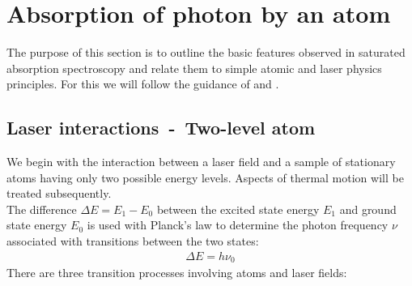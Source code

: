 
\chapter{Absorption of photon by an atom}  %
The purpose of this section is to outline the basic features observed in saturated absorption
spectroscopy and relate them to simple atomic and laser physics principles.
For this we will follow the guidance of \citep{SAS} and \citep{SAS_appendix}.

\ifpdf{}
    \graphicspath{{Chapter2/Figs/Raster/}{Chapter2/Figs/PDF/}{Chapter2/Figs/}}
\else
    \graphicspath{{Chapter2/Figs/Vector/}{Chapter2/Figs/}}
\fi



\section{Laser interactions~-~Two-level atom} %

We begin with the interaction between a laser field and a sample of stationary atoms having
only two possible energy levels. Aspects of thermal motion will be treated subsequently.\\
The difference \(\Delta E = E_1 - E_0\) between the excited state  energy \(E_1\) and
ground state  energy \(E_0\) is used with Planck's law to determine the photon frequency
\(\nu \) associated with transitions between the two states:
\begin{align}
    \Delta E = h \nu_0
\end{align}
There are three transition processes involving atoms and laser fields:
\bigskip

